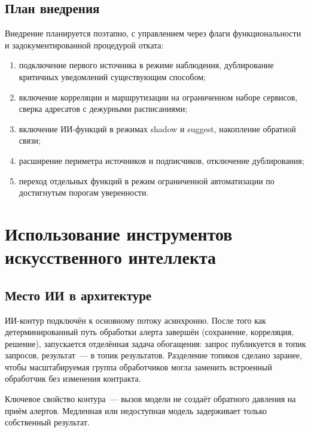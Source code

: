 \documentclass[utf8x, 12pt]{G7-32} %
\begin{document}
\section{План внедрения}
Внедрение планируется поэтапно, с управлением через флаги функциональности и
задокументированной процедурой отката:
\begin{enumerate}[1.]
    \item подключение первого источника в режиме наблюдения, дублирование
          критичных уведомлений существующим способом;
    \item включение корреляции и маршрутизации на ограниченном наборе сервисов,
          сверка адресатов с дежурными расписаниями;
    \item включение ИИ-функций в режимах shadow и suggest, накопление обратной
          связи;
    \item расширение периметра источников и подписчиков, отключение
          дублирования;
    \item переход отдельных функций в режим ограниченной автоматизации по
          достигнутым порогам уверенности.
\end{enumerate}


\chapter{Использование инструментов искусственного интеллекта}

\section{Место ИИ в архитектуре}
ИИ-контур подключён к основному потоку асинхронно. После того как
детерминированный путь обработки алерта завершён (сохранение, корреляция,
решение), запускается отделённая задача обогащения: запрос публикуется в топик
запросов, результат~--- в топик результатов. Разделение топиков сделано
заранее, чтобы масштабируемая группа обработчиков могла заменить встроенный
обработчик без изменения контракта.

Ключевое свойство контура~--- вызов модели не создаёт обратного давления на
приём алертов. Медленная или недоступная модель задерживает только собственный
результат.
\end{document}
